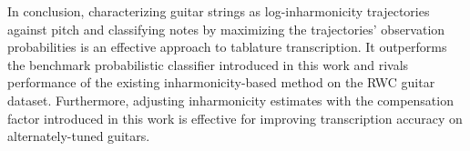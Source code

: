 \documentclass[12pt]{cmuthesis}
\begin{document}
In conclusion, characterizing guitar strings as log-inharmonicity trajectories against pitch and classifying notes by maximizing the trajectories' observation probabilities is an effective approach to tablature transcription. It outperforms the benchmark probabilistic classifier introduced in this work and rivals performance of the existing inharmonicity-based method on the RWC guitar dataset. Furthermore, adjusting inharmonicity estimates with the compensation factor introduced in this work is effective for improving transcription accuracy on alternately-tuned guitars.




%

\backmatter


\renewcommand{\bibsection}{\chapter{\bibname}}

\end{document}
